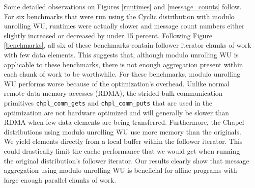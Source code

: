 Some detailed observations on Figures \ref{runtimes} and \ref{message_counts} follow. For six benchmarks that were run using the Cyclic distribution with modulo unrolling WU, runtimes were actually slower and message count numbers either slightly increased or decreased by under 15 percent. Following Figure \ref{benchmarks}, all six of these benchmarks contain follower iterator chunks of work with few data elements. This suggests that, although modulo unrolling WU is applicable to these benchmarks, there is not enough aggregation present within each chunk of work to be worthwhile. For these benchmarks, modulo unrolling WU performs worse because of the optimization's overhead. Unlike normal remote data memory accesses (RDMA), the strided bulk communication primitives \texttt{chpl\_comm\_gets} and \texttt{chpl\_comm\_puts} that are used in the optimization are not hardware optimized and will generally be slower than RDMA when few data elements are being transferred. Furthermore, the Chapel distributions using modulo unrolling WU use more memory than the originals. We yield elements directly from a local buffer within the follower iterator. This could drastically limit the cache performance that we would get when running the original distribution's follower iterator. Our results clearly show that message aggregation using modulo unrolling WU is beneficial for affine programs with large enough parallel chunks of work.

